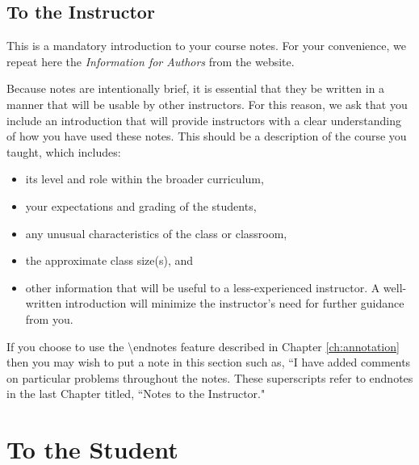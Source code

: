 \documentclass[oneside]{book}
\begin{document}
\begin{annotation}
\chapter{To the Instructor}

This is a mandatory introduction to your course notes.  For your convenience, we repeat here
the \emph{Information for Authors} from the website.

Because notes are intentionally brief, it is essential that they be written in a manner that will be usable by other
instructors. For this reason, we ask that you include an introduction that will provide instructors
with a clear understanding of how you have used these notes. This should be a description of the
course you taught, which includes:
\begin{itemize}
\item  its level and role within the broader curriculum,
\item  your expectations and grading of the students,
\item  any unusual characteristics of the class or classroom,
\item  the approximate class size(s), and
\item other information that will be useful to a less-experienced instructor.
A well-written introduction will minimize the instructor's need for further guidance from you.
\end{itemize}

If you choose to use the \textbackslash endnotes feature described in Chapter \ref{ch:annotation} then
you may wish to put a note in this section such as, ``I have added comments on particular problems
throughout the notes.  These superscripts refer to endnotes in the last Chapter titled,
``Notes to the Instructor."

\end{annotation}



\chapter{ To the Student}

\end{document}

